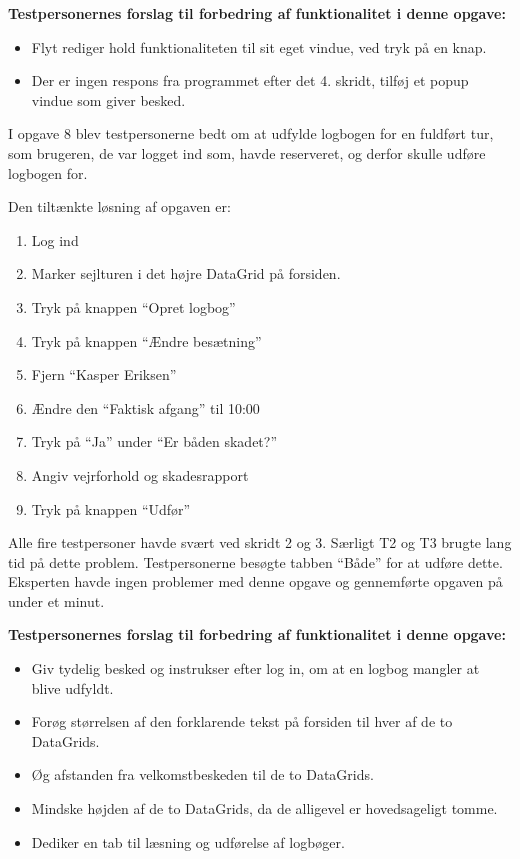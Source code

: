 \textbf{Testpersonernes forslag til forbedring af funktionalitet i denne opgave:}
\begin{itemize}
    \item Flyt rediger hold funktionaliteten til sit eget vindue, ved tryk på en knap.
    \item Der er ingen respons fra programmet efter det 4. skridt, tilføj et popup vindue som giver besked.
\end{itemize}


I opgave 8 blev testpersonerne bedt om at udfylde logbogen for en fuldført tur, som brugeren, de var logget ind som, havde reserveret, og derfor skulle udføre logbogen for.

Den tiltænkte løsning af opgaven er:
\begin{enumerate}
    \item Log ind
    \item Marker sejlturen i det højre DataGrid på forsiden.
    \item Tryk på knappen ``Opret logbog''
    \item Tryk på knappen ``Ændre besætning''
    \item Fjern ``Kasper Eriksen''
    \item Ændre den ``Faktisk afgang'' til 10:00
    \item Tryk på ``Ja'' under ``Er båden skadet?''
    \item Angiv vejrforhold og skadesrapport
    \item Tryk på knappen ``Udfør''
\end{enumerate}

Alle fire testpersoner havde svært ved skridt 2 og 3.
Særligt T2 og T3 brugte lang tid på dette problem.
Testpersonerne besøgte tabben ``Både'' for at udføre dette. 
Eksperten havde ingen problemer med denne opgave og gennemførte opgaven på under et minut.

\textbf{Testpersonernes forslag til forbedring af funktionalitet i denne opgave:}
\begin{itemize}
    \item Giv tydelig besked og instrukser efter log in, om at en logbog mangler at blive udfyldt.
    \item Forøg størrelsen af den forklarende tekst på forsiden til hver af de to DataGrids.
    \item Øg afstanden fra velkomstbeskeden til de to DataGrids.
    \item Mindske højden af de to DataGrids, da de alligevel er hovedsageligt tomme. 
    \item Dediker en tab til læsning og udførelse af logbøger. 
\end{itemize}


